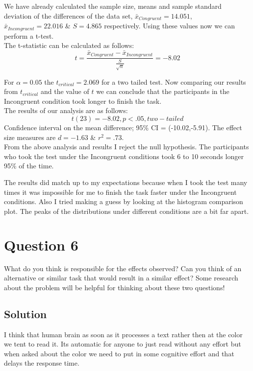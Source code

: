 \documentclass[12pt]{article}%
\begin{document}
We have already calculated the sample size, means and sample standard deviation of the differences of the data set,  $\bar{x}_{Congruent} = 14.051$, $\bar{x}_{Incongruent} = 22.016$ \& $S = 4.865$ respectively. Using these values now we can perform a t-test.\\

The t-statistic can be calculated as follows:
   \begin{equation}
     t = \frac{\bar{x}_{Congruent} - \bar{x}_{Incongruent}}{\frac{S}{\sqrt{n}}} = -8.02
   \end{equation} 
 
For $\alpha=0.05$ the $t_{critical} = 2.069$ for a two tailed test. Now comparing our results from $t_{critical}$ and the value of $t$ we can conclude that the participants in the Incongruent condition took longer to finish the task.\\

The results of our analysis are as follows:
   \begin{equation}
     t(23) = -8.02, p < .05, two-tailed
   \end{equation} 
Confidence interval on the mean difference; 95\% CI = (-10.02,-5.91). The effect size measures are $d = -1.63$ \& $r^{2} = .73$.\\

From the above analysis and results I reject the null hypothesis. The participants who took the test under the Incongruent conditions took 6 to 10 seconds longer 95\% of the time.

\newline The results did match up to my expectations because when I took the test many times it was impossible for me to finish the task faster under the Incongruent conditions. Also I tried making a guess by looking at the histogram comparison plot. The peaks of the distributions under different conditions are a bit far apart.

\section*{Question 6}
What do you think is responsible for the effects observed? Can you think of an alternative or similar task that would result in a similar effect? Some research about the problem will be helpful for thinking about these two questions!

\subsection*{Solution}
I think that human brain as soon as it processes a text rather then at the color we tent to read it. Its automatic for anyone to just read without any effort but when asked about the color we need to put in some cognitive effort and that delays the response time.
\end{document}
